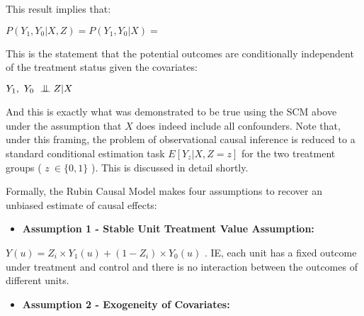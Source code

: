 \documentclass[../main.tex]{subfiles}
\begin{document}
\vspace{\baselineskip}
This result implies that:\par


\vspace{\baselineskip}
 \( P \left( Y_{1}, Y_{0}  \vert  X, Z  \right) =P \left( Y_{1}, Y_{0} \vert  X \right)  =   \) \par


\vspace{\baselineskip}
This is the statement that the potential outcomes are conditionally independent of the treatment status given the covariates:\par

 \( Y_{1},~Y_{0} ~ \bigCI Z  \vert  X \) \par

And this is exactly what was demonstrated to be true using the SCM above under the assumption that  \( X \) does indeed include all confounders. Note that, under this framing, the problem of observational causal inference is reduced to a standard conditional estimation task  \( E \left[ Y_{z}  \vert  X, Z=z \right]  \) for the two treatment groups ( \( z~ \in  \{ 0, 1 \}  \) ). This is discussed in detail shortly.\par


\vspace{\baselineskip}
Formally, the Rubin Causal Model makes four assumptions to recover an unbiased estimate of causal effects:\par


\vspace{\baselineskip}
\begin{itemize}
    \item \textbf{Assumption 1 - Stable Unit Treatment Value Assumption:}
\end{itemize}\par

\begin{adjustwidth}{0.5in}{0.0in}
 \( Y \left( u \right)  =Z_{i} \times Y_{1} \left( u \right) + \left( 1-Z_{i} \right)  \times Y_{0} \left( u \right)  \) . IE, each unit has a fixed outcome under treatment and control and there is no interaction between the outcomes of different units.\par

\end{adjustwidth}


\vspace{\baselineskip}
\begin{itemize}
    \item \textbf{Assumption 2 - Exogeneity of Covariates:}
\end{itemize}\par
\end{document}
